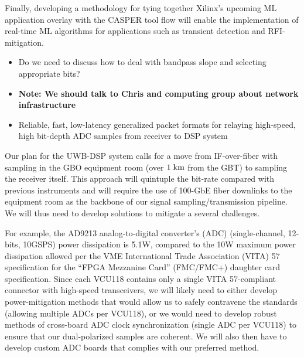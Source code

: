 \documentclass[10pt]{myNSF}
\begin{document}
Finally, developing a methodology for tying together Xilinx’s upcoming
ML application overlay with the CASPER tool flow will enable the
implementation of real-time ML algorithms for applications such as
transient detection and RFI-mitigation.

\begin{itemize}
\item{Do we need to discuss how to deal with bandpass slope and
    selecting appropriate bits?}
\end{itemize}


\begin{itemize}
\item{\textbf{Note: We should talk to Chris and computing group
      about network infrastructure}}
\item{Reliable, fast, low-latency generalized packet formats for
    relaying high-speed, high bit-depth ADC samples from receiver to
    DSP system}
\end{itemize}

Our plan for the UWB-DSP system calls for a move from IF-over-fiber
with sampling in the GBO equipment room (over $1\; \textrm{km}$ from the GBT)
to sampling the receiver itself.  This approach will quintuple the
bit-rate compared with previous instruments and will require the use
of 100-GbE fiber downlinks to the equipment room as the backbone of
our signal sampling/transmission pipeline.  We will thus need to
develop solutions to mitigate a several challenges.

For example, the AD9213 analog-to-digital converter’s (ADC)
(single-channel, 12-bits, 10GSPS) power dissipation is 5.1W, compared
to the 10W maximum power dissipation allowed per the VME International
Trade Association (VITA) 57 specification for the “FPGA Mezzanine
Card” (FMC/FMC+) daughter card specification. Since each VCU118
contains only a single VITA 57-compliant connector with high-speed
transceivers, we will likely need to either develop power-mitigation
methods that would allow us to safely contravene the standards
(allowing multiple ADCs per VCU118), or we would need to develop
robust methods of cross-board ADC clock synchronization (single ADC
per VCU118) to ensure that our dual-polarized samples are coherent. We
will also then have to develop custom ADC boards that complies with
our preferred method.
\end{document}
